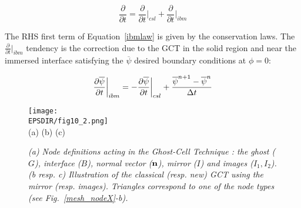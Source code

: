 \vspace{-0.25cm}
\begin{equation}
\frac{\partial }{\partial t} = \frac{\partial }{\partial t}\bigg|_{csl} + \frac{\partial }{\partial t}\bigg|_{ibm}
\label{ibmlaw}
\end{equation}
\vspace{-0.25cm}

The RHS first term of Equation~\eqref{ibmlaw} is given by the conservation laws. The $\frac{\partial}{\partial t}\big|_{ibm}$ tendency is the correction due to the GCT in the solid region and near the immersed interface satisfying the $\overline{\psi}$ desired boundary conditions at $\phi=0$:

\vspace{-0.25cm}
\begin{equation}
\frac{\partial \overline{\psi}}{\partial t}\bigg|_{ibm}=-\frac{\partial \overline{\psi}}{\partial t}\bigg|_{csl}+\frac{\overline{\psi}^{n+1}-\overline{\psi}^{n}}{\Delta t} \\
\end{equation}
\vspace{-0.25cm} 

\begin{figure}[!ht]
\begin{center}
   \texttt{[image: \\EPSDIR/fig10\_2.png]}	\\
		\vspace{-1mm} 	(a) \hspace{5.2cm} (b) \hspace{5.3cm} (c)
	\small \caption {{\it  (a) Node definitions acting in the Ghost-Cell Technique : the ghost ($G$), interface ($B$), normal vector (${\bf n}$), mirror ($I$) and images ($I_1,I_2$). (b resp. c) Illustration of the classical (resp. new) GCT using the mirror (resp. images). Triangles correspond to one of the node types (see Fig.~\ref{mesh_nodeX}-b).}}
	\label{ghost_image34}
\end{center}
\end{figure}

